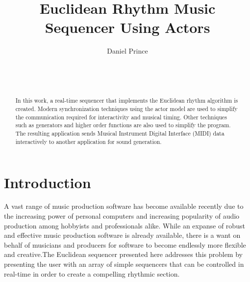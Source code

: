 \documentclass{sig-alternate-05-2015}
\begin{document}

\title{Euclidean Rhythm Music Sequencer Using Actors}


%
\author{
\alignauthor
Daniel Prince\\
       \\
       \\
       \\
}

\maketitle
\begin{abstract}
In this work, a real-time sequencer that implements the Euclidean rhythm algorithm is created. Modern synchronization techniques using the actor model are used to simplify the communication required for interactivity and musical timing. Other techniques such as generators and higher order functions are also used to simplify the program. The resulting application sends Musical Instrument Digital Interface (MIDI) data interactively to another application for sound generation.
\end{abstract}

\section{Introduction}

A vast range of music production software has become available recently due to the increasing power of personal computers and increasing popularity of audio production among hobbyists and professionals alike. While an expanse of robust and effective music production software is already available, there is a want on behalf of musicians and producers for software to become endlessly more flexible and creative.The Euclidean sequencer presented here addresses this problem by presenting the user with an array of simple sequencers that can be controlled in real-time in order to create a compelling rhythmic section.
\end{document}

